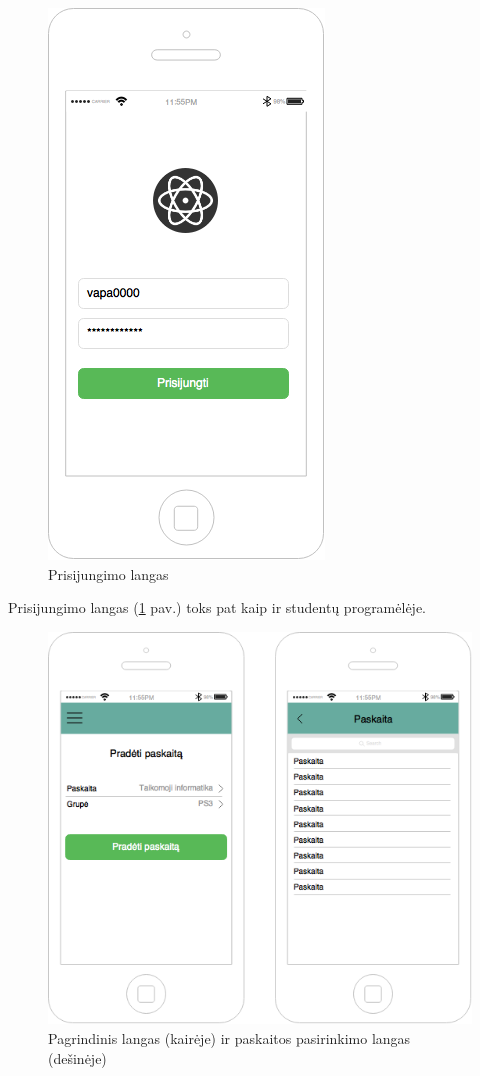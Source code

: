 \documentclass{VUMIFPSkursinis}
\begin{document}
\begin{figure}[H]
	\centering
	\includegraphics[scale=0.5]{img/kursinio_app_login}
	\caption{Prisijungimo langas}
	\label{img:scannerLoginView}
\end{figure}

Prisijungimo langas (\ref{img:scannerLoginView} pav.) toks pat kaip ir studentų programėlėje.

\begin{figure}[H]
	\centering
	\includegraphics[scale=0.5]{img/kursinio_app_dest_main}
	\caption{Pagrindinis langas (kairėje) ir paskaitos pasirinkimo langas (dešinėje)}
	\label{img:scannerMainView}
\end{figure}
\end{document}

